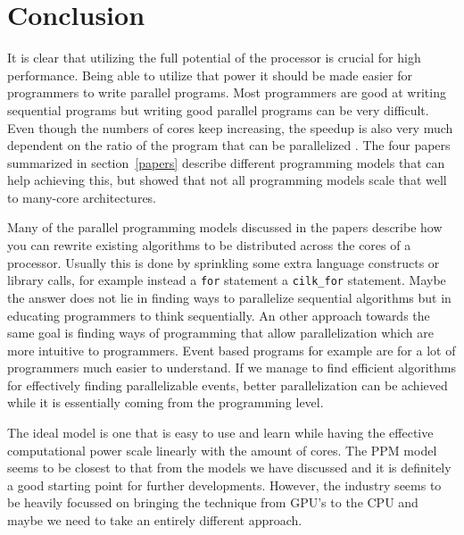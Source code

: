 \section{Conclusion}


It is clear that utilizing the full potential of the processor is crucial for
high performance. Being able to utilize that power it should be made easier for
programmers to write parallel programs. Most programmers are good at writing
sequential programs but writing good parallel programs can be very difficult.
Even though the numbers of cores keep increasing, the speedup is also very much
dependent on the ratio of the program that can be parallelized
\cite{hennessy2007computer}. The four papers summarized in section~\ref{papers}
describe different programming models that can help achieving this, but
\cite{CaoPerformanceAnalysis} showed that not all programming models scale that
well to many-core architectures.

Many of the parallel programming models discussed in the papers describe how
you can rewrite existing algorithms to be distributed across the cores of a
processor. Usually this is done by sprinkling some extra language constructs or
library calls, for example instead a \texttt{for} statement a
\texttt{cilk\_for} statement. Maybe the answer does not lie in finding ways to
parallelize sequential algorithms but in educating programmers to think
sequentially. An other approach towards the same goal is finding ways of
programming that allow parallelization which are more intuitive to programmers.
Event based programs for example are for a lot of programmers much easier to
understand. If we manage to find efficient algorithms for effectively finding
parallelizable events, better parallelization can be achieved while it is
essentially coming from the programming level.

The ideal model is one that is easy to use and learn while having the effective
computational power scale linearly with the amount of cores. The PPM model
seems to be closest to that from the models we have discussed and it is
definitely a good starting point for further developments. However, the
industry seems to be heavily focussed on bringing the technique from GPU's to
the CPU and maybe we need to take an entirely different approach.
